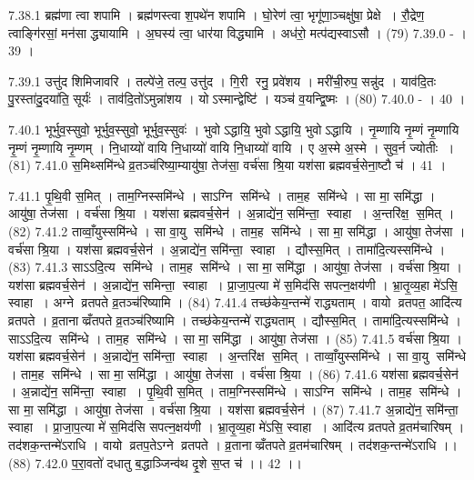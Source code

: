 7.38.1
ब्रह्म॑णा त्वा शपामि । ब्रह्म॑णस्त्वा श॒पथे॑न शपामि । घो॒रेण॑ त्वा॒ भृगू॑णा॒ञ्चक्षु॑षा॒ प्रेक्षे । रौ॒द्रेण॒ त्वाङ्गि॑रसां॒ मन॑सा द्ध्यायामि । अ॒घस्य॑ त्वा॒ धार॑या विद्ध्यामि । अध॑रो॒ मत्प॑द्यस्वाऽसौ । (79)
7.39.0
- । 39 ।
\anuvakamend

7.39.1
उत्तु॑द शिमिजावरि । तल्पे॑जे॒ तल्प॒ उत्तु॑द । गि॒री रनु॒ प्रवे॑शय । मरी॑ची॒रुप॒ सन्नु॑द । याव॑दि॒तः पु॒रस्ता॑दु॒दया॑ति॒ सूर्यः॑ । ताव॑दि॒तो॑ऽमुन्ना॑शय । योऽस्मान्द्वेष्टि॑ । यञ्च॑ व॒यन्द्वि॒ष्मः । (80)
7.40.0
- । 40 ।
\anuvakamend

7.40.1
भूर्भुव॒स्सुवो॒ भूर्भुव॒स्सुवो॒ भूर्भुव॒स्सुवः॑ । भुवोऽद्धायि॒ भुवोऽद्धायि॒ भुवोऽद्धायि । नृ॒म्णायि नृ॒म्णं नृ॒म्णायि नृ॒म्णं नृ॒म्णायि नृ॒म्णम् । नि॒धाय्यो॑ वायि नि॒धाय्यो॑ वायि नि॒धाय्यो॑ वायि । ए अ॒स्मे अ॒स्मे । सुव॒र्न ज्योतीः । (81)
7.41.0
स॒मिथ्समि॑न्धे व्र॒तञ्च॑रिष्या॒म्यायु॑षा॒ तेज॑सा॒ वर्च॑सा श्रि॒या यश॑सा ब्रह्मवर्च॒सेना॒ष्टौ च॑ । 41 ।
\anuvakamend

7.41.1
पृ॒थि॒वी स॒मित् । ताम॒ग्निस्समि॑न्धे । साऽग्नि समि॑न्धे । ताम॒ह समि॑न्धे । सा मा॒ समि॑द्धा । आयु॑षा॒ तेज॑सा । वर्च॑सा श्रि॒या । यश॑सा ब्रह्मवर्च॒सेन॑ । अ॒न्नाद्ये॑न॒ समि॑न्ता॒ स्वाहा । अ॒न्तरि॑क्ष॒ स॒मित् । (82)
7.41.2
ताव्वाँ॒युस्समि॑न्धे । सा वा॒यु समि॑न्धे । ताम॒ह समि॑न्धे । सा मा॒ समि॑द्धा । आयु॑षा॒ तेज॑सा । वर्च॑सा श्रि॒या । यश॑सा ब्रह्मवर्च॒सेन॑ । अ॒न्नाद्ये॑न॒ समि॑न्ता॒ स्वाहा । द्यौस्स॒मित् । तामा॑दि॒त्यस्समि॑न्धे । (83)
7.41.3
साऽऽदि॒त्य समि॑न्धे । ताम॒ह समि॑न्धे । सा मा॒ समि॑द्धा । आयु॑षा॒ तेज॑सा । वर्च॑सा श्रि॒या । यश॑सा ब्रह्मवर्च॒सेन॑ । अ॒न्नाद्ये॑न॒ समिन्ता॒ स्वाहा । प्रा॒जा॒प॒त्या मे॑ स॒मिद॑सि सपत्न॒क्षय॑णी । भ्रा॒तृ॒व्य॒हा मे॑ऽसि॒ स्वाहा । अग्ने व्रतपते व्र॒तञ्च॑रिष्यामि । (84)
7.41.4
तच्छ॑केय॒न्तन्मे॑ राद्ध्यताम् । वायो व्रतपत॒ आदि॑त्य व्रतपते । व्र॒तानाव्व्रँतपते व्र॒तञ्च॑रिष्यामि । तच्छ॑केय॒न्तन्मे॑ राद्ध्यताम् । द्यौस्स॒मित् । तामा॑दि॒त्यस्समि॑न्धे । साऽऽदि॒त्य समि॑न्धे । ताम॒ह समि॑न्धे । सा मा॒ समि॑द्धा । आयु॑षा॒ तेज॑सा । (85)
7.41.5
वर्च॑सा श्रि॒या । यश॑सा ब्रह्मवर्च॒सेन॑ । अ॒न्नाद्ये॑न॒ समि॑न्ता॒ स्वाहा । अ॒न्तरि॑क्ष स॒मित् । ताव्वाँ॒युस्समि॑न्धे । सा वा॒यु समि॑न्धे । ताम॒ह समि॑न्धे । सा मा॒ समि॑द्धा । आयु॑षा॒ तेज॑सा । वर्च॑सा श्रि॒या । (86)
7.41.6
यश॑सा ब्रह्मवर्च॒सेन॑ । अ॒न्नाद्ये॑न॒ समि॑न्ता॒ स्वाहा । पृ॒थि॒वी स॒मित् । ताम॒ग्निस्समि॑न्धे । साऽग्नि समि॑न्धे । ताम॒ह समि॑न्धे । सा मा॒ समि॑द्धा । आयु॑षा॒ तेज॑सा । वर्च॑सा श्रि॒या । यश॑सा ब्रह्मवर्च॒सेन॑ । (87)
7.41.7
अ॒न्नाद्ये॑न॒ समि॑न्ता॒ स्वाहा । प्रा॒जा॒प॒त्या मे॑ स॒मिद॑सि सपत्न॒क्षय॑णी । भ्रा॒तृ॒व्य॒हा मे॑ऽसि॒ स्वाहा । आदि॑त्य व्रतपते व्र॒तम॑चारिषम् । तद॑शक॒न्तन्मे॑ऽराधि । वायो व्रतप॒तेऽग्ने व्रतपते । व्र॒तानाव्व्रँतपते व्र॒तम॑चारिषम् । तद॑शक॒न्तन्मे॑ऽराधि ।। (88)
7.42.0
प॒रा॒वतो॑ दधातु ब॒द्धाञ्जिन्व॑थ दृ॒शे स॒प्त च॑ ।। 42 ।।
\anuvakamend

